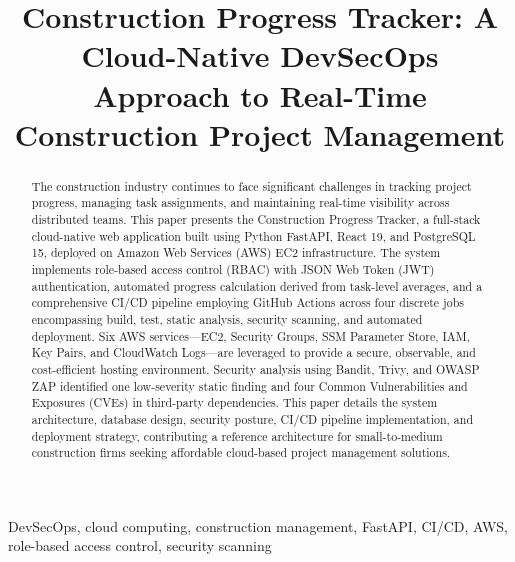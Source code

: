 \documentclass[conference]{IEEEtran}
\begin{document}
\title{Construction Progress Tracker: A Cloud-Native DevSecOps Approach to Real-Time Construction Project Management}

\author{
}

\maketitle

\begin{abstract}
The construction industry continues to face significant challenges in tracking project progress, managing task assignments, and maintaining real-time visibility across distributed teams. This paper presents the Construction Progress Tracker, a full-stack cloud-native web application built using Python FastAPI, React 19, and PostgreSQL 15, deployed on Amazon Web Services (AWS) EC2 infrastructure. The system implements role-based access control (RBAC) with JSON Web Token (JWT) authentication, automated progress calculation derived from task-level averages, and a comprehensive CI/CD pipeline employing GitHub Actions across four discrete jobs encompassing build, test, static analysis, security scanning, and automated deployment. Six AWS services---EC2, Security Groups, SSM Parameter Store, IAM, Key Pairs, and CloudWatch Logs---are leveraged to provide a secure, observable, and cost-efficient hosting environment. Security analysis using Bandit, Trivy, and OWASP ZAP identified one low-severity static finding and four Common Vulnerabilities and Exposures (CVEs) in third-party dependencies. This paper details the system architecture, database design, security posture, CI/CD pipeline implementation, and deployment strategy, contributing a reference architecture for small-to-medium construction firms seeking affordable cloud-based project management solutions.
\end{abstract}

\begin{IEEEkeywords}
DevSecOps, cloud computing, construction management, FastAPI, CI/CD, AWS, role-based access control, security scanning
\end{IEEEkeywords}
\end{document}
